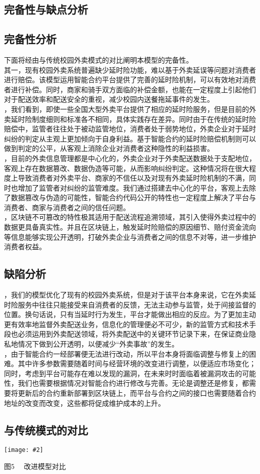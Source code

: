 \documentclass[UTF8]{ctexart}
\newcommand\picturehere[2][1]{\centerline{\texttt{[image: \#2]}}}
\newcommand\picfig[1]{\centerline{\small \heiti #1 \songti }}
\begin{document}
\begin{multicols}{2}
\section{完备性与缺点分析}
\subsection{完备性分析}
\indent 下面将经由与传统校园外卖模式的对比阐明本模型的完备性。\\
\indent 其一，现有校园外卖系统普遍缺少延时险功能，难以基于外卖延误等问题对消费者进行赔偿。该模型运用智能合约平台提供了完善的延时险机制，可以有效地对消费者进行补偿。同时，商家和骑手双方面临的补偿金额，也能在一定程度上引起他们对于配送效率和配送安全的重视，减少校园内送餐拖延事件的发生。\\
，我们看到，即使一些全国大型外卖平台提供了相应的延时险服务，但是目前的外卖延时险制度细则和标准各不相同，具体实践存在差异。同时由于在传统的延时险赔偿中，监管者往往处于被动监管地位，消费者处于弱势地位，外卖企业对于延时纠纷的判定从主观上更加倾向于自身利益。基于智能合约的延时险赔偿机制则可以做到判定的公平，从客观上消除企业对消费者这种隐性的利益损害。\\
，目前的外卖信息管理都是中心化的，外卖企业对于外卖配送数据处于支配地位，客观上存在数据篡改、数据伪造等可能，从而影响纠纷判定。这种情况将在很大程度上导致消费者对外卖平台、商家的不信任以及对现有外卖延时险机制的不满，同时也增加了监管者对纠纷的监管难度。我们通过搭建去中心化的平台，客观上去除了数据篡改与伪造的可能性，智能合约代码公开的特性也一定程度上解决了平台与消费者、商家与消费者之间的信任问题。\\
，区块链不可篡改的特性极其适用于配送流程追溯领域，其引入使得外卖过程中的数据更具备真实性。并且在区块链上，触发延时险赔偿的原因细节、赔付资金流向等信息能够实现公开透明，打破外卖企业与消费者之间的信息不对等，进一步维护消费者权益。\cite{fuck}
\subsection{缺陷分析}
，我们的模型优化了现有的校园外卖系统，但是对于该平台本身来说，它在外卖延时险服务中往往只能接受来自消费者的反馈，无法主动参与监管，处于间接监督的位置。换句话说，只有当延时行为发生，平台才能做出相应的反应。为了更加主动更有效率地监督外卖配送业务，信息化的管理便必不可少，新的监管方式和技术手段也必须运用到外卖配送领域，将外卖配送中的关键环节记录下来，在保证商业隐私地情况下做到公开透明，以便减少“外卖事故”的发生。\\
，由于智能合约一经部署便无法进行改动，所以平台本身将面临调整与修复上的困难。其中许多参数需要随着时间与经营环境的改变进行调整，以便适应市场变化；同时，考虑到平台可能存在难以发现的漏洞，在未来时时面临着被漏洞攻击的可能性，我们也需要根据情况对智能合约进行修改与完善。无论是调整还是修复，都需要将更新后的合约重新部署到区块链上，而平台与合约之间的接口也需要随着合约地址的改变而改变，这些都将促成维护成本的上升。
\subsection{与传统模式的对比}
\picturehere[0.55]{image/advance.png}
\picfig{图5  \ \  改进模型对比}


\end{multicols}

\renewcommand{\refname}{参考文献}


\end{document}

